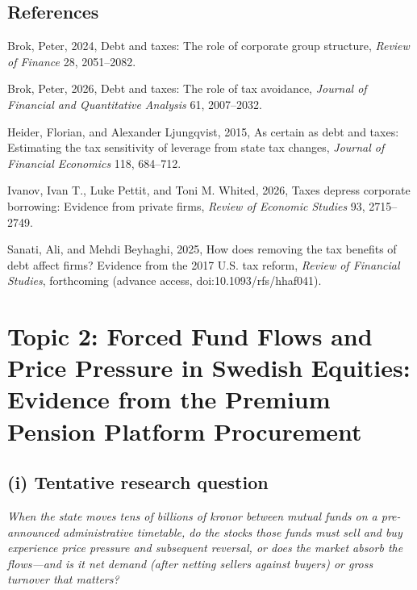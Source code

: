 \documentclass[12pt,a4paper]{article}
\newenvironment{refs}{\begin{list}{}{\setlength{\leftmargin}{1.5em}\setlength{\itemindent}{-1.5em}\setlength{\itemsep}{1pt}}}{\end{list}}
\begin{document}
\subsection*{References}
\begin{refs}
\item Brok, Peter, 2024, Debt and taxes: The role of corporate group structure, \emph{Review of Finance} 28, 2051--2082.
\item Brok, Peter, 2026, Debt and taxes: The role of tax avoidance, \emph{Journal of Financial and Quantitative Analysis} 61, 2007--2032.
\item Heider, Florian, and Alexander Ljungqvist, 2015, As certain as debt and taxes: Estimating the tax sensitivity of leverage from state tax changes, \emph{Journal of Financial Economics} 118, 684--712.
\item Ivanov, Ivan T., Luke Pettit, and Toni M. Whited, 2026, Taxes depress corporate borrowing: Evidence from private firms, \emph{Review of Economic Studies} 93, 2715--2749.
\item Sanati, Ali, and Mehdi Beyhaghi, 2025, How does removing the tax benefits of debt affect firms? Evidence from the 2017 U.S. tax reform, \emph{Review of Financial Studies}, forthcoming (advance access, doi:10.1093/rfs/hhaf041).
\end{refs}

\newpage

\section{Topic 2: Forced Fund Flows and Price Pressure in Swedish Equities: Evidence from the Premium Pension Platform Procurement}

\subsection{(i) Tentative research question}

\emph{When the state moves tens of billions of kronor between mutual funds on a pre-announced administrative timetable, do the stocks those funds must sell and buy experience price pressure and subsequent reversal, or does the market absorb the flows---and is it net demand (after netting sellers against buyers) or gross turnover that matters?}
\end{document}
